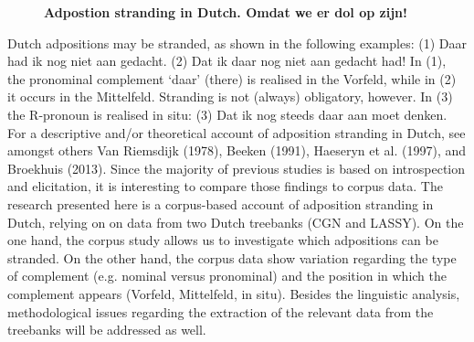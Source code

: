 \documentclass[10pt, a4paper, twopage, headinclude, footinclude, BCOR5mm]{book}
\begin{document}
\newpage

\begin{figure}[t!]
\centering
\large\textbf{Adpostion stranding in Dutch. Omdat we er dol op zijn!}
\vspace*{0.5cm}
\end{figure}


\begin{table}[t!]
\end{table} 
\noindent
Dutch adpositions may be stranded, as shown in the following examples:  (1) Daar had ik nog niet aan gedacht. (2) Dat ik daar nog niet aan gedacht had!  In (1), the pronominal complement `daar' (there) is realised in the Vorfeld, while in (2) it occurs in the Mittelfeld. Stranding is not (always) obligatory, however. In (3) the R-pronoun is realised in situ:  (3) Dat ik nog steeds daar aan moet denken.  For a descriptive and/or theoretical account of adposition stranding in Dutch, see amongst others Van Riemsdijk (1978), Beeken (1991), Haeseryn et al. (1997), and Broekhuis (2013). Since the majority of previous studies is based on introspection and elicitation, it is interesting to compare those findings to corpus data. The research presented here is a corpus-based account of adposition stranding in Dutch, relying on on data from two Dutch treebanks (CGN and LASSY).   On the one hand, the corpus study allows us to investigate which adpositions can be stranded. On the other hand, the corpus data show variation regarding the type of complement (e.g. nominal versus pronominal) and the position in which the complement appears (Vorfeld, Mittelfeld, in situ). Besides the linguistic analysis, methodological issues regarding the extraction of the relevant data from the treebanks will be addressed as well.  
\end{document}
